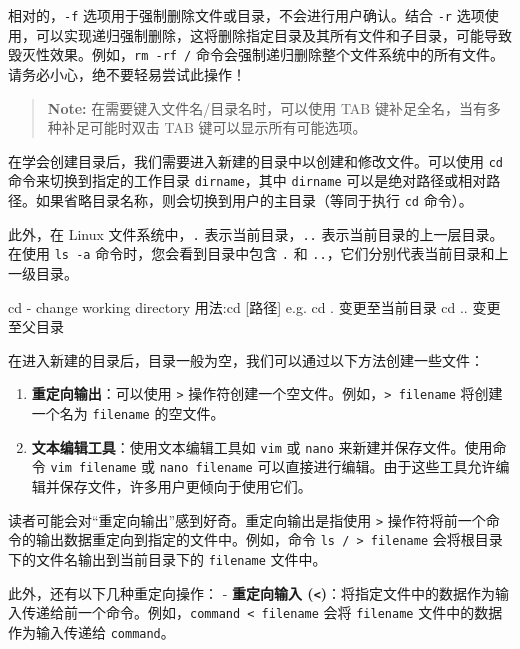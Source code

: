 相对的，\texttt{-f} 选项用于强制删除文件或目录，不会进行用户确认。结合 \texttt{-r} 选项使用，可以实现递归强制删除，这将删除指定目录及其所有文件和子目录，可能导致毁灭性效果。例如，\texttt{rm\ -rf\ /} 命令会强制递归删除整个文件系统中的所有文件。请务必小心，绝不要轻易尝试此操作！

\begin{quote}
\textbf{Note:} 在需要键入文件名/目录名时，可以使用 TAB 键补足全名，当有多种补足可能时双击 TAB 键可以显示所有可能选项。
\end{quote}

在学会创建目录后，我们需要进入新建的目录中以创建和修改文件。可以使用 \texttt{cd} 命令来切换到指定的工作目录 \texttt{dirname}，其中 \texttt{dirname} 可以是绝对路径或相对路径。如果省略目录名称，则会切换到用户的主目录（等同于执行 \texttt{cd} 命令）。

此外，在 Linux 文件系统中，\texttt{.} 表示当前目录，\texttt{..} 表示当前目录的上一层目录。在使用 \texttt{ls\ -a} 命令时，您会看到目录中包含 \texttt{.} 和 \texttt{..}，它们分别代表当前目录和上一级目录。

\begin{CodeBlock}[language=BookShell]
cd - change working directory
用法:cd [路径]
e.g.
	cd . 变更至当前目录
	cd .. 变更至父目录
\end{CodeBlock}

在进入新建的目录后，目录一般为空，我们可以通过以下方法创建一些文件：

\begin{enumerate}
\def\labelenumi{\arabic{enumi}.}
\tightlist
\item
  \textbf{重定向输出}：可以使用 \texttt{\textgreater{}} 操作符创建一个空文件。例如，\texttt{\textgreater{}\ filename} 将创建一个名为 \texttt{filename} 的空文件。
\item
  \textbf{文本编辑工具}：使用文本编辑工具如 \texttt{vim} 或 \texttt{nano} 来新建并保存文件。使用命令 \texttt{vim\ filename} 或 \texttt{nano\ filename} 可以直接进行编辑。由于这些工具允许编辑并保存文件，许多用户更倾向于使用它们。
\end{enumerate}

读者可能会对``重定向输出''感到好奇。重定向输出是指使用 \texttt{\textgreater{}} 操作符将前一个命令的输出数据重定向到指定的文件中。例如，命令 \texttt{ls\ /\ \textgreater{}\ filename} 会将根目录下的文件名输出到当前目录下的 \texttt{filename} 文件中。

此外，还有以下几种重定向操作： - \textbf{重定向输入 (\texttt{\textless{}})}：将指定文件中的数据作为输入传递给前一个命令。例如，\texttt{command\ \textless{}\ filename} 会将 \texttt{filename} 文件中的数据作为输入传递给 \texttt{command}。

